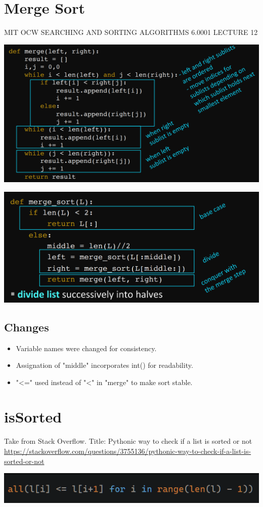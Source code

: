 \documentclass[11pt]{article}
\begin{document}
\section{Merge Sort}
\label{sec:org4bc3642}
MIT OCW SEARCHING AND SORTING ALGORITHMS 6.0001 LECTURE 12
\begin{center}
\includegraphics[width=.9\linewidth]{./Screenshot 2022-03-16 100339.png}
\end{center}
\begin{center}
\includegraphics[width=.9\linewidth]{./Screenshot 2022-03-16 100418.png}
\end{center}
\subsection{Changes}
\label{sec:org36b19cc}
\begin{itemize}
\item Variable names were changed for consistency.
\item Assignation of "middle" incorporates int() for readability.
\item "<=" used instead of "<" in "merge" to make sort stable.
\end{itemize}
\section{isSorted}
\label{sec:org8a11782}
Take from Stack Overflow.
Title: Pythonic way to check if a list is sorted or not
\url{https://stackoverflow.com/questions/3755136/pythonic-way-to-check-if-a-list-is-sorted-or-not}
\begin{center}
\includegraphics[width=.9\linewidth]{./Screenshot 2022-03-18 083426.png}
\end{center}
\end{document}
